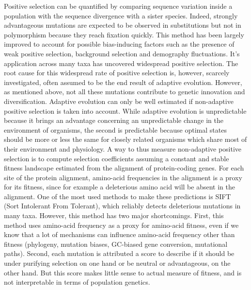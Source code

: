 \documentclass{article}
\begin{document}
    Positive selection can be quantified by comparing sequence variation inside a population with the sequence divergence with a sister species\cite{mcdonald_adaptative_1991}.
    Indeed, strongly advantageous mutations are expected to be observed in substitutions but not in polymorphism because they reach fixation quickly.
    This method has been largely improved to account for possible bias-inducing factors such as the presence of weak positive selection, background selection and demography fluctuations\cite{eyre-walker_distribution_2006, eyre-walker_estimating_2009, galtier_adaptive_2016, tataru_inference_2017}.
    It's application across many taxa has uncovered widespread positive selection\cite{moutinho_variation_2019}.
    The root cause for this widespread rate of positive selection is, however, scarcely investigated, often assumed to be the end result of adaptive evolution.
    However, as mentioned above, not all these mutations contribute to genetic innovation and diversification.
    Adaptive evolution can only be well estimated if non-adaptive positive selection is taken into account.
    While adaptive evolution is unpredictable because it brings an advantage concerning an unpredictable change in the environment of organisms, the second is predictable because optimal states should be more or less the same for closely related organisms which share most of their environment and physiology.
    A way to thus measure non-adaptive positive selection is to compute selection coefficients assuming a constant and stable fitness landscape estimated from the alignment of protein-coding genes.
    For each site of the protein alignment, amino-acid frequencies in the alignment is a proxy for its fitness, since for example a deleterious amino acid will be absent in the alignment.
    One of the most used methods to make these predictions is SIFT (Sort Intolerant From Tolerant), which reliably detects deleterious mutations in many taxa\cite{ng_sift_2003, vaser_sift_2016}.
    However, this method has two major shortcomings.
    First, this method uses amino-acid frequency as a proxy for amino-acid fitness, even if we know that a lot of mechanisms can influence amino-acid frequency other than fitness (phylogeny, mutation biases, GC-biased gene conversion, mutational paths).
    Second, each mutation is attributed a score to describe if it should be under purifying selection on one hand or be neutral or advantageous, on the other hand.
    But this score makes little sense to actual measure of fitness, and is not interpretable in terms of population genetics.
\end{document}
